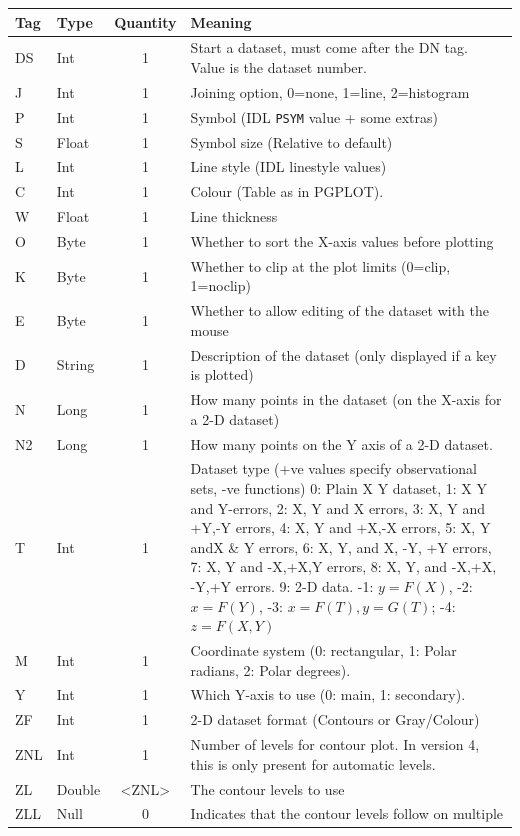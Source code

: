 \documentclass[english]{article}
\begin{document}
\begin{longtable}{|llcp{8cm}|}
  \hline Tag& Type& Quantity&
  Meaning\\
  \hline
  \endhead
  \hline
  \endfoot
  DS& Int& 1& Start a dataset, must come after the DN tag. Value is the
  dataset
  number.\\
  J& Int& 1&
  Joining option, 0=none, 1=line, 2=histogram\\
  P& Int& 1&
  Symbol (IDL \texttt{PSYM} value + some extras)\\
  S& Float& 1&
  Symbol size (Relative to default)\\
  L& Int& 1&
  Line style (IDL linestyle values)\\
  C& Int& 1&
  Colour (Table as in PGPLOT).\\
  W& Float& 1&
  Line thickness\\
  O& Byte& 1&
  Whether to sort the X-axis values before plotting\\
  K& Byte& 1&
  Whether to clip at the plot limits (0=clip, 1=noclip)\\
  E& Byte& 1&
  Whether to allow editing of the dataset with the mouse\\
  D& String& 1&
  Description of the dataset (only displayed if a key is plotted)\\
  N& Long& 1&
  How many points in the dataset (on the X-axis for a 2-D dataset)\\
  N2& Long& 1&
  How many points on the Y axis of a 2-D dataset.\\
  T& Int& 1& Dataset type (+ve values specify observational sets, -ve
  functions) 0: Plain X Y dataset, 1: X Y and Y-errors, 2: X, Y and X
  errors, 3: X, Y and +Y,-Y errors, 4: X, Y and +X,-X errors, 5: X, Y
  andX \& Y errors, 6: X, Y, and X, -Y, +Y errors, 7: X, Y and -X,+X,Y
  errors, 8: X, Y, and -X,+X, -Y,+Y errors. 9: 2-D data. -1: $y=F(X)$, -2:
  $x=F(Y)$, -3: $x=F(T),
  y=G(T)$; -4: $z=F(X,Y)$\\
  M& Int& 1&
  Coordinate system (0: rectangular, 1: Polar radians, 2: Polar
  degrees).\\
  Y & Int & 1 & Which Y-axis to use (0: main, 1: secondary).\\
  ZF& Int& 1&
  2-D dataset format (Contours or Gray/Colour)\\
  ZNL& Int& 1&
  Number of levels for contour plot. In version 4, this is only present
  for automatic levels.\\
  ZL& Double& <ZNL>&
  The contour levels to use\\
  ZLL & Null & 0 & Indicates that the contour levels follow on multiple

\end{longtable}
\end{document}
